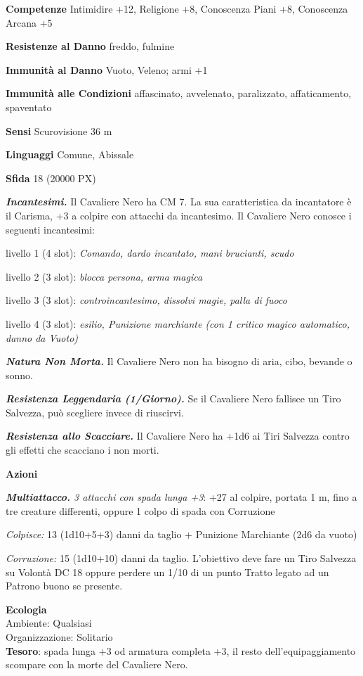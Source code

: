 \begin{multicols}{2}
\textbf{Competenze} Intimidire +12, Religione +8, Conoscenza Piani +8, Conoscenza Arcana +5

\textbf{Resistenze al Danno} freddo, fulmine

\textbf{Immunità al Danno} Vuoto, Veleno; armi +1

\textbf{Immunità alle Condizioni} affascinato, avvelenato, paralizzato, affaticamento, spaventato

\textbf{Sensi} Scurovisione 36 m

\textbf{Linguaggi} Comune, Abissale

\textbf{Sfida} 18 (20000 PX)

\textit{\textbf{Incantesimi.}} Il Cavaliere Nero ha CM 7. La sua caratteristica da incantatore è il Carisma, +3 a colpire con attacchi da incantesimo. Il Cavaliere Nero conosce i seguenti incantesimi:

livello 1 (4 slot): \textit{Comando, dardo incantato, mani brucianti, scudo}

livello 2 (3 slot): \textit{blocca persona, arma magica}

livello 3 (3 slot): \textit{controincantesimo, dissolvi magie, palla di fuoco}

livello 4 (3 slot): \textit{esilio, Punizione marchiante (con 1 critico magico automatico, danno da Vuoto)}

\textit{\textbf{Natura Non Morta.}} Il Cavaliere Nero non ha bisogno di aria, cibo, bevande o sonno.

\textit{\textbf{Resistenza Leggendaria (1/Giorno).}} Se il Cavaliere Nero fallisce un Tiro Salvezza, può scegliere invece di riuscirvi.

\textit{\textbf{Resistenza allo Scacciare.}} Il Cavaliere Nero ha +1d6 ai Tiri Salvezza contro gli effetti che scacciano i non morti.

\textbf{Azioni}

\textit{\textbf{Multiattacco.} 3 attacchi con spada lunga +3}: +27 al colpire, portata 1 m, fino a tre creature differenti, oppure 1 colpo di spada con Corruzione

\textit{Colpisce:} 13 (1d10+5+3) danni da taglio + Punizione Marchiante (2d6 da vuoto)

\textit{Corruzione:} 15 (1d10+10) danni da taglio. L'obiettivo deve fare un Tiro Salvezza su Volontà DC 18 oppure perdere un 1/10 di un punto Tratto legato ad un Patrono buono se presente.

\textbf{Ecologia}\\
Ambiente: Qualsiasi\\
Organizzazione: Solitario\\
\textbf{Tesoro}: spada lunga +3 od armatura completa +3, il resto dell'equipaggiamento scompare con la morte del Cavaliere Nero.\\


\end{multicols}

